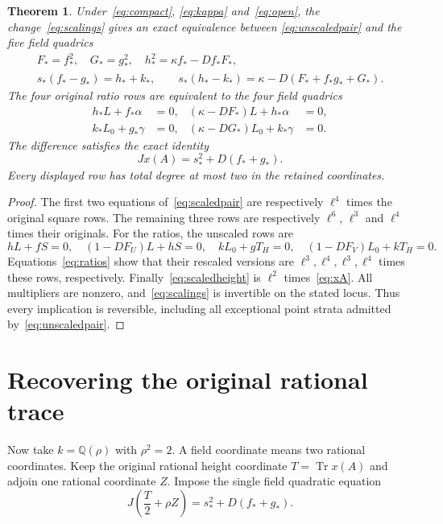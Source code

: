 \documentclass[11pt,a4paper]{article}
\newtheorem{theorem}{Theorem}[section]
\theoremstyle{remark}\newtheorem{remark}[theorem]{Remark}
\newcommand{\Q}{\mathbb Q}
\DeclareMathOperator{\Tr}{Tr}
\begin{document}
\begin{theorem}\label{thm:scaled}
Under~\eqref{eq:compact}, \eqref{eq:kappa} and~\eqref{eq:open},
the change~\eqref{eq:scalings} gives an exact equivalence between
\eqref{eq:unscaledpair} and the five field quadrics
\begin{equation}\label{eq:scaledpair}
 \begin{gathered}
 F_*=f_*^2,\quad G_*=g_*^2,\quad
 h_*^2=\kappa f_*-Df_*F_*,\\
 s_*(f_*-g_*)=h_*+k_*,\qquad
 s_*(h_*-k_*)=\kappa-D(F_*+f_*g_*+G_*).
 \end{gathered}
\end{equation}
The four original ratio rows are equivalent to the four field quadrics
\begin{equation}\label{eq:scaledratios}
 \begin{aligned}
 h_*L+f_*\alpha&=0,&
 (\kappa-DF_*)L+h_*\alpha&=0,\\
 k_*L_0+g_*\gamma&=0,&
 (\kappa-DG_*)L_0+k_*\gamma&=0.
 \end{aligned}
\end{equation}
The difference satisfies the exact identity
\begin{equation}\label{eq:scaledheight}
                Jx(A)=s_*^2+D(f_*+g_*).
\end{equation}
Every displayed row has total degree at most two in the retained
coordinates.
\end{theorem}

\begin{proof}
The first two equations of~\eqref{eq:scaledpair} are respectively
$\ell^4$ times the original square rows. The remaining three rows
are respectively $\ell^6$, $\ell^3$ and $\ell^4$ times their originals.
For the ratios, the unscaled rows are
\[
 hL+fS=0,\quad(1-DF_U)L+hS=0,
 \quad kL_0+gT_H=0,\quad(1-DF_V)L_0+kT_H=0.
\]
Equations~\eqref{eq:ratios} show that their rescaled versions are
$\ell^3,\ell^4,\ell^3,\ell^4$ times these rows, respectively.
Finally~\eqref{eq:scaledheight} is $\ell^2$ times~\eqref{eq:xA}.
All multipliers are nonzero, and~\eqref{eq:scalings} is invertible
on the stated locus. Thus every implication is reversible, including
all exceptional point strata admitted by~\eqref{eq:unscaledpair}.
\end{proof}

\section{Recovering the original rational trace}
Now take $k=\Q(\rho)$ with $\rho^2=2$. A field coordinate means two
rational coordinates. Keep the original rational height coordinate
$T=\Tr x(A)$ and adjoin one rational coordinate $Z$. Impose the
single field quadratic equation
\begin{equation}\label{eq:trace}
              J\left(\frac T2+\rho Z\right)
                   =s_*^2+D(f_*+g_*).
\end{equation}
\end{document}
